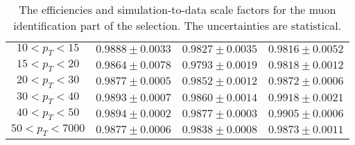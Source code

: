 \begin{table}[!ht]
\begin{center}
\begin{tabular}{c|c|c|c}
\hline 
$ 10 < p_T <  15$ & $0.9888 \pm 0.0033$ & $0.9827 \pm 0.0035$ & $0.9816 \pm 0.0052$  \\
$ 15 < p_T <  20$ & $0.9864 \pm 0.0078$ & $0.9793 \pm 0.0019$ & $0.9818 \pm 0.0012$  \\
$ 20 < p_T <  30$ & $0.9877 \pm 0.0005$ & $0.9852 \pm 0.0012$ & $0.9872 \pm 0.0006$  \\
$ 30 < p_T <  40$ & $0.9893 \pm 0.0007$ & $0.9860 \pm 0.0014$ & $0.9918 \pm 0.0021$  \\
$ 40 < p_T <  50$ & $0.9894 \pm 0.0002$ & $0.9877 \pm 0.0003$ & $0.9905 \pm 0.0006$  \\
$ 50 < p_T < 7000$ & $0.9877 \pm 0.0006$ & $0.9838 \pm 0.0008$ & $0.9873 \pm 0.0011$  \\
\hline
\end{tabular}
\caption{The efficiencies and simulation-to-data scale factors for the muon
identification part of the selection.
The uncertainties are statistical.}
\label{tab:eff_muon_id}
\end{center}
\end{table}

